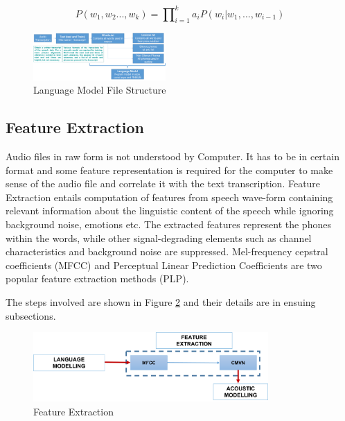 \documentclass{article}
\begin{document}

\begin{equation}
P(w_{1},w_{2}...,w_{k}) = \prod\nolimits_{i = 1}^{k} a_{i} P(w_{i} | w_{1},...,w_{i-1})
\end{equation}

\begin{figure}[h]
    \centering
    \includegraphics[width=0.45\textwidth]{img/LM.png}
    \caption{Language Model File Structure}
    \label{fig:lang-model1}
\end{figure}

\subsection{Feature Extraction}
\label{sec:feature-extraction}
Audio files in raw form is not understood by Computer. It has to be in certain format and some feature representation is required for the computer to make sense of the audio file and correlate it with the text transcription. Feature Extraction entails computation of features from speech wave-form containing relevant information about the linguistic content of the speech while ignoring background noise, emotions etc. The extracted features represent the phones within the words, while other signal-degrading elements such as channel characteristics and background noise are suppressed. Mel-frequency cepstral coefficients (MFCC) and Perceptual Linear Prediction Coefficients are two popular feature extraction methods (PLP). %

The steps involved are shown in Figure \ref{fig:working_pipeline-3} and their details are in ensuing subsections.

\begin{figure}[h]
    \centering
    \includegraphics[width=0.8\textwidth]{img/workflow-3.png}
    \caption{Feature Extraction}
    \label{fig:working_pipeline-3}
\end{figure}
\end{document}
